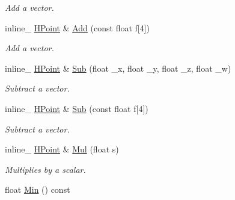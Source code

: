 \begin{DoxyCompactItemize}
\begin{DoxyCompactList}\small\item\em Add a vector. \end{DoxyCompactList}\item 
inline\+\_\+ \hyperlink{classHPoint}{H\+Point} \& \hyperlink{classHPoint_ac98c43aed4f928ba5393985b47b31630}{Add} (const float f\mbox{[}4\mbox{]})\hypertarget{classHPoint_ac98c43aed4f928ba5393985b47b31630}{}\label{classHPoint_ac98c43aed4f928ba5393985b47b31630}

\begin{DoxyCompactList}\small\item\em Add a vector. \end{DoxyCompactList}\item 
inline\+\_\+ \hyperlink{classHPoint}{H\+Point} \& \hyperlink{classHPoint_ac99006202ea5b04f84abc1b8875ad0d9}{Sub} (float \+\_\+x, float \+\_\+y, float \+\_\+z, float \+\_\+w)\hypertarget{classHPoint_ac99006202ea5b04f84abc1b8875ad0d9}{}\label{classHPoint_ac99006202ea5b04f84abc1b8875ad0d9}

\begin{DoxyCompactList}\small\item\em Subtract a vector. \end{DoxyCompactList}\item 
inline\+\_\+ \hyperlink{classHPoint}{H\+Point} \& \hyperlink{classHPoint_a0cebe5d5bf5e39c04f04863e0b902a91}{Sub} (const float f\mbox{[}4\mbox{]})\hypertarget{classHPoint_a0cebe5d5bf5e39c04f04863e0b902a91}{}\label{classHPoint_a0cebe5d5bf5e39c04f04863e0b902a91}

\begin{DoxyCompactList}\small\item\em Subtract a vector. \end{DoxyCompactList}\item 
inline\+\_\+ \hyperlink{classHPoint}{H\+Point} \& \hyperlink{classHPoint_ab94bdf382bf9166c872f7b06993ec13b}{Mul} (float s)\hypertarget{classHPoint_ab94bdf382bf9166c872f7b06993ec13b}{}\label{classHPoint_ab94bdf382bf9166c872f7b06993ec13b}

\begin{DoxyCompactList}\small\item\em Multiplies by a scalar. \end{DoxyCompactList}\item 
float \hyperlink{classHPoint_a5a24f3c82f145ed4ca6a194143cd0f01}{Min} () const \hypertarget{classHPoint_a5a24f3c82f145ed4ca6a194143cd0f01}{}\label{classHPoint_a5a24f3c82f145ed4ca6a194143cd0f01}


\end{DoxyCompactItemize}
